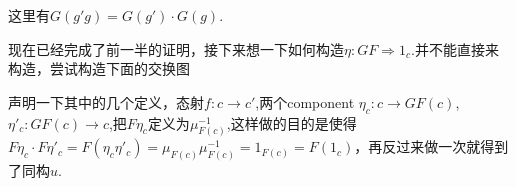 \documentclass{article}
\newcommand{\To}{\Rightarrow}
\newcommand*{\xfunc}[4]{{#2}\colon{#3}{#1}{#4}}
\newcommand*{\func}[3]{\xfunc{\to}{#1}{#2}{#3}}
\newcommand*{\Func}[3]{\xfunc{\To}{#1}{#2}{#3}}
\begin{document}
\begin{center}
\end{center}

这里有$G(g'g)=G(g')\cdot G(g)$.

现在已经完成了前一半的证明，接下来想一下如何构造$\Func{\eta}{GF}{1_c}$.并不能直接来构造，尝试构造下面的交换图
\begin{center}
\end{center}
声明一下其中的几个定义，态射$\func{f}{c}{c'}$,两个component $\func{\eta_c}{c}{GF(c)}$, $\func{\eta'_c}{GF(c)}{c}$,把$F\eta_c$定义为$\mu^{-1}_{F(c)}$,这样做的目的是使得$F\eta_c  \cdot F\eta'_c=F(\eta_c\eta'_c) =\mu_{F(c)}\mu^{-1}_{F(c)}=1_{F(c)}=F(1_c)$，再反过来做一次就得到了同构$u$.
\end{document}
